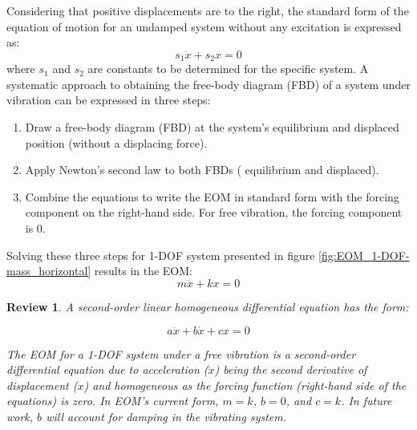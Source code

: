 \documentclass[12pt,letter]{article}
\numberwithin{ex}{section} %
\newtheorem{re}{Review}
\numberwithin{re}{section} %
\newenvironment{review}{\begin{mdframed}[middlelinewidth=2mm,roundcorner=20pt]\begin{re}\normalfont}{\end{re}\end{mdframed}}
\numberwithin{vcs}{section} %
\begin{document}
		Considering that positive displacements are to the right, the standard form of the equation of motion for an undamped system without any excitation is expressed as:  
		\begin{equation}
			s_1 \ddot{x} + s_2 x = 0
		\end{equation}			
		where $s_1$ and $s_2$ are constants to be determined for the specific system. A systematic approach to obtaining the free-body diagram (FBD) of a system under vibration can be expressed in three steps:
		\begin{enumerate}
			\item Draw a free-body diagram (FBD) at the system's equilibrium and displaced position (without a displacing force).
			\item Apply Newton's second law to both FBDs ( equilibrium and displaced).
			\item Combine the equations to write the EOM in standard form with the forcing component on the right-hand side. For free vibration, the forcing component is 0. 
		\end{enumerate}
			
		Solving these three steps for 1-DOF system presented in figure \ref{fig:EOM_1-DOF-mass_horizontal} results in the EOM:
		\begin{equation}
			m \ddot{x} + k x = 0
		\end{equation}

		\begin{review}
			A second-order linear homogeneous differential equation has the form:
			
			\begin{equation}
			 a \ddot{x} + b \dot{x} + cx = 0
			\end{equation}
		
			\noindent The EOM for a 1-DOF system under a free vibration is a second-order differential equation due to acceleration ($\ddot{x}$) being the second derivative of displacement ($x$) and homogeneous as the forcing function (right-hand side of the equations) is zero. In EOM's current form, $m=k$, $b=0$,  and $c=k$. In future work, $b$ will account for damping in the vibrating system.     
		\end{review}
\end{document}
